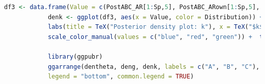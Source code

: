 \begin{enumerate}[leftmargin=*]
\begin{tcolorbox}[enhanced,width=4.67in,center upper,
	fontupper=\large\bfseries,drop shadow southwest,sharp corners]
\begin{VF}
\begin{lstlisting}[language=R]
			df3 <- data.frame(Value = c(PostABC_AR[1:Sp,5], PostABC_ARown[1:Sp,5], PostABC_ARownRegAd[1:Sp,5]), Distribution = factor(c(rep("EasyABC", Sp), rep("ABC", Sp), rep("ABCAdj", Sp))))
			denk <- ggplot(df3, aes(x = Value, color = Distribution)) +   geom_density(linewidth = 1) + geom_vline(xintercept = k, linetype = "dashed", color = "red", linewidth = 1) +
			labs(title = TeX("Posterior density plot: k"), x = TeX("$k$"), y = "Posterior density") +
			scale_color_manual(values = c("blue", "red", "green")) +  theme_minimal() + theme(legend.title = element_blank())
			
			library(ggpubr)
			ggarrange(dentheta, deng, denk, labels = c("A", "B", "C"), ncol = 3, nrow = 1,
			legend = "bottom", common.legend = TRUE)
		\end{lstlisting}
	\end{VF}
\end{tcolorbox}



\end{enumerate}